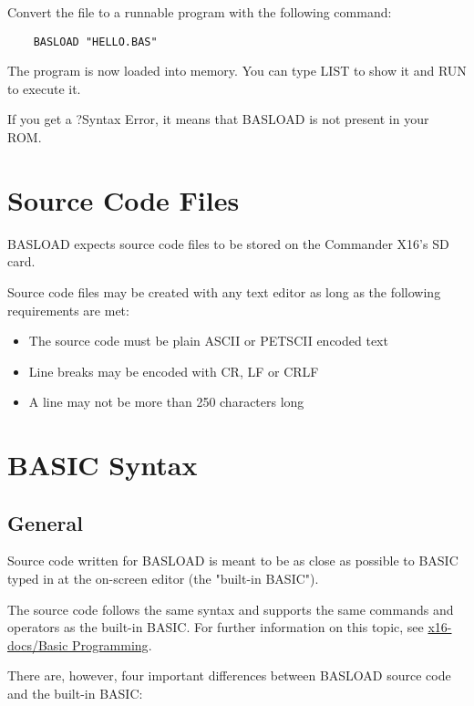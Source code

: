 \documentclass{article}
\begin{document}
    Convert the file to a runnable program with the following
    command:

    \begin{verbatim}
    BASLOAD "HELLO.BAS"
    \end{verbatim}

    The program is now loaded into memory. You can type LIST to
    show it and RUN to execute it.

    If you get a ?Syntax Error, it means that BASLOAD is not
    present in your ROM.

\section{Source Code Files}

    BASLOAD expects source code files to be stored on the 
    Commander X16's SD card.

    Source code files may be created with any text editor as
    long as the following requirements are met:

    \begin{itemize}
        \item The source code must be plain ASCII or PETSCII encoded text
        \item Line breaks may be encoded with CR, LF or CRLF
        \item A line may not be more than 250 characters long
    \end{itemize}

\section{BASIC Syntax}

    \subsection{General}

        Source code written for BASLOAD is meant to be as close as
        possible to BASIC typed in at the on-screen editor
        (the "built-in BASIC").

        The source code follows the same syntax and supports the
        same commands and operators as the built-in
        BASIC. For further information on this topic, see
        \href{https://github.com/X16Community/x16-docs/blob/master/X16%20Reference%20-%2003%20-%20BASIC.md}
        {x16-docs/Basic Programming}.

        There are, however, four important differences between
        BASLOAD source code and the built-in BASIC:
\end{document}

